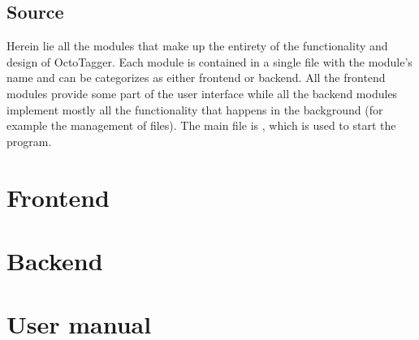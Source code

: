 \subsection{Source}
Herein lie all the modules that make up the entirety of the functionality and
design of OctoTagger. Each module is contained in a single file with the
module's name and can be categorizes as either frontend or backend. All the
frontend modules provide some part of the user interface while all the backend
modules implement mostly all the functionality that happens in the background
(for example the management of files). The main file is ,
which is used to start the program.



\section{Frontend}













\section{Backend}












\section{User manual}
\def\kapitelautor{Julian Lorenz}


